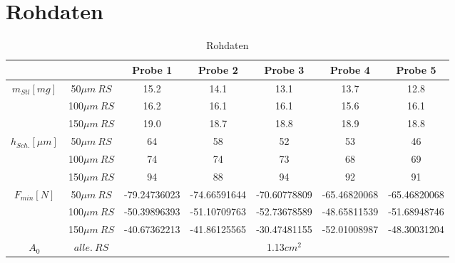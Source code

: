 \documentclass[12pt,UTF8]{article}
\begin{document}
\section{Rohdaten}
\begin{table}[H]
    \centering
    \caption{Rohdaten}
    \begin{tabular}{ccccccc}
        \midrule
                                           &                & Probe 1                        & Probe 2      & Probe 3      & Probe 4      & Probe 5      \\
        \toprule
        \multirow{3}{*}{$m_{Stl}[mg]$}     & 50$\mu m\ RS$  & 15.2                           & 14.1         & 13.1         & 13.7         & 12.8         \\
                                           & 100$\mu m\ RS$ & 16.2                           & 16.1         & 16.1         & 15.6         & 16.1         \\
                                           & 150$\mu m\ RS$ & 19.0                           & 18.7         & 18.8         & 18.9         & 18.8         \\
        \toprule
        \multirow{3}{*}{$h_{Sch.}[\mu m]$} & 50$\mu m\ RS$  & 64                             & 58           & 52           & 53           & 46           \\
                                           & 100$\mu m\ RS$ & 74                             & 74           & 73           & 68           & 69           \\
                                           & 150$\mu m\ RS$ & 94                             & 88           & 94           & 92           & 91           \\
        \toprule
        \multirow{3}{*}{$F_{min}[N]$}      & 50$\mu m\ RS$  & -79.24736023                   & -74.66591644 & -70.60778809 & -65.46820068 & -65.46820068 \\
                                           & 100$\mu m\ RS$ & -50.39896393                   & -51.10709763 & -52.73678589 & -48.65811539 & -51.68948746 \\
                                           & 150$\mu m\ RS$ & -40.67362213                   & -41.86125565 & -30.47481155 & -52.01008987 & -48.30031204 \\
        \toprule
        $A_0$                              & $alle.\ RS$    & \multicolumn{5}{c}{1.13$cm^2$}                                                             \\
        \midrule
    \end{tabular}
\end{table}
\end{document}

